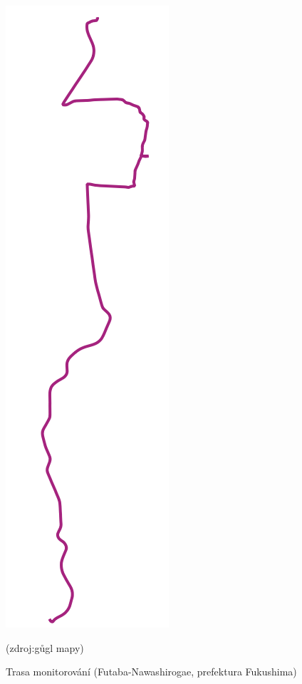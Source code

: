 \begin{figure}[H]
    \centering
    \includegraphics[scale=0.2]{./pictures/trasa_monitorovani.png}
      	\caption[Trasa monitorování (Futaba-Nawashirogae, prefektura Fukushima)]{Trasa monitorování (Futaba-Nawashirogae, prefektura Fukushima)}(zdroj:gůgl mapy)
    	\label{fig:interpolatedMap}
\end{figure}

